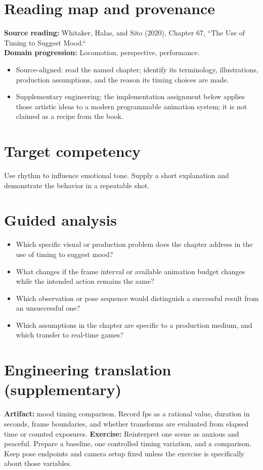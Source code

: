 \documentclass[10pt,letterpaper]{article}
\begin{document}
\makedoctitle
\makedocsummary

\section{Reading map and provenance}
\textbf{Source reading:} Whitaker, Halas, and Sito (2020), Chapter 67, ``The Use of Timing to Suggest Mood.``\\
\textbf{Domain progression:} Locomotion, perspective, performance.
\begin{itemize}
\item Source-aligned: read the named chapter; identify its terminology, illustrations, production assumptions, and the reason its timing choices are made.
\item Supplementary engineering: the implementation assignment below applies those artistic ideas to a modern programmable animation system; it is not claimed as a recipe from the book.
\end{itemize}
\section{Target competency}
Use rhythm to influence emotional tone. Supply a short explanation and demonstrate the behavior in a repeatable shot.
\section{Guided analysis}
\begin{itemize}
\item Which specific visual or production problem does the chapter address in the use of timing to suggest mood?
\item What changes if the frame interval or available animation budget changes while the intended action remains the same?
\item Which observation or pose sequence would distinguish a successful result from an unsuccessful one?
\item Which assumptions in the chapter are specific to a production medium, and which transfer to real-time games?
\end{itemize}
\section{Engineering translation (supplementary)}
\textbf{Artifact:} mood timing comparison. Record fps as a rational value, duration in seconds, frame boundaries, and whether transforms are evaluated from elapsed time or counted exposures.
\textbf{Exercise:} Reinterpret one scene as anxious and peaceful. Prepare a baseline, one controlled timing variation, and a comparison. Keep pose endpoints and camera setup fixed unless the exercise is specifically about those variables.
\end{document}
